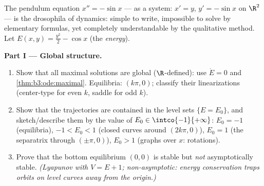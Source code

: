 \begin{problem}\label{pb:b3:ode:1}
The pendulum equation $x'' = -\sin x$ --- as a system: $x' =
y$, $y' = -\sin x$ on $\R^2$ --- is the drosophila of
dynamics: simple to write, impossible to solve by elementary
formulas, yet completely understandable by the qualitative
method. Let $E(x, y) = \frac{y^2}2 - \cos x$ (the
\emph{energy}).

\medskip
\noindent\textbf{Part I --- Global structure.}
\begin{enumerate}
  \item Show that all maximal solutions are global
        ($\R$-defined): use $\dot E = 0$ and
        \cref{thm:b3:ode:maximal}. Equilibria: $(k\pi, 0)$;
        classify their linearizations (center-type for even
        $k$, saddle for odd $k$).
  \item Show that the trajectories are contained in the level
        sets $\{E = E_0\}$, and sketch/describe them by the
        value of $E_0 \in \intco{-1}{+\infty}$: $E_0 = -1$
        (equilibria), $-1 < E_0 < 1$ (closed curves around
        $(2k\pi, 0)$), $E_0 = 1$ (the separatrix through
        $(\pm\pi, 0)$), $E_0 > 1$ (graphs over $x$:
        rotations).
  \item Prove that the bottom equilibrium $(0,0)$ is stable
        but \emph{not} asymptotically stable. \emph{(Lyapunov
        with $V = E + 1$; non-asymptotic: energy conservation
        traps orbits on level curves away from the
        origin.)}
\end{enumerate}


\end{problem}
